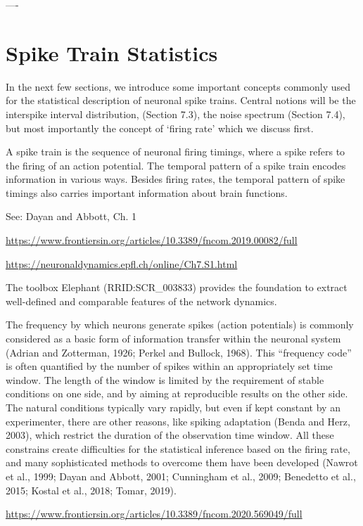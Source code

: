 ----



\section{Spike Train Statistics}
In the next few sections, we introduce some important concepts commonly used for the statistical description of neuronal spike trains. Central notions will be the interspike interval distribution, (Section 7.3), the noise spectrum (Section 7.4), but most importantly the concept of ‘firing rate’ which we discuss first.

A spike train is the sequence of neuronal firing timings, where a spike refers to the firing of an action potential. The temporal pattern of a spike train encodes information in various ways. Besides firing rates, the temporal pattern of spike timings also carries important information about brain functions. 

See: Dayan and Abbott, Ch. 1

\url{https://www.frontiersin.org/articles/10.3389/fncom.2019.00082/full}

\url{https://neuronaldynamics.epfl.ch/online/Ch7.S1.html}

The toolbox Elephant (RRID:SCR\_003833) provides the foundation to extract well-defined and comparable features of the network dynamics. 

The frequency by which neurons generate spikes (action potentials) is commonly considered as a basic form of information transfer within the neuronal system (Adrian and Zotterman, 1926; Perkel and Bullock, 1968). This “frequency code” is often quantified by the number of spikes within an appropriately set time window. The length of the window is limited by the requirement of stable conditions on one side, and by aiming at reproducible results on the other side. The natural conditions typically vary rapidly, but even if kept constant by an experimenter, there are other reasons, like spiking adaptation (Benda and Herz, 2003), which restrict the duration of the observation time window. All these constrains create difficulties for the statistical inference based on the firing rate, and many sophisticated methods to overcome them have been developed (Nawrot et al., 1999; Dayan and Abbott, 2001; Cunningham et al., 2009; Benedetto et al., 2015; Kostal et al., 2018; Tomar, 2019).

\url{https://www.frontiersin.org/articles/10.3389/fncom.2020.569049/full}

